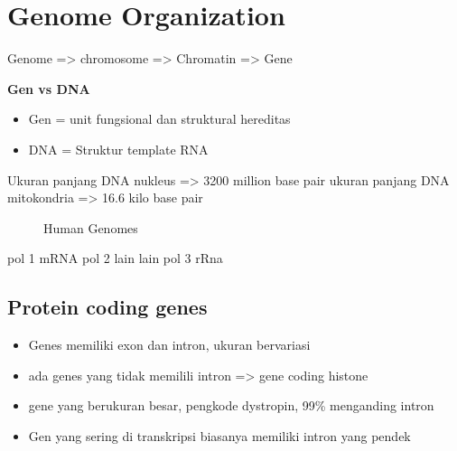 \documentclass[
  letterpaper,
  DIV=11,
  numbers=noendperiod]{scrreprt}
\providecommand{\tightlist}{%
  \setlength{\itemsep}{0pt}\setlength{\parskip}{0pt}}\usepackage{longtable,booktabs,array}
\begin{document}
\section{Genome Organization}\label{genome-organization}

Genome =\textgreater{} chromosome =\textgreater{} Chromatin
=\textgreater{} Gene

\textbf{Gen vs DNA}

\begin{itemize}
\tightlist
\item
  Gen = unit fungsional dan struktural hereditas
\item
  DNA = Struktur template RNA
\end{itemize}

Ukuran panjang DNA nukleus =\textgreater{} 3200 million base pair ukuran
panjang DNA mitokondria =\textgreater{} 16.6 kilo base pair

\begin{figure}


\caption{\label{fig-genomes}Human Genomes}

\end{figure}%

pol 1 mRNA pol 2 lain lain pol 3 rRna

\subsection{Protein coding genes}\label{protein-coding-genes}

\begin{itemize}
\tightlist
\item
  Genes memiliki exon dan intron, ukuran bervariasi
\item
  ada genes yang tidak memilili intron =\textgreater{} gene coding
  histone
\item
  gene yang berukuran besar, pengkode dystropin, 99\% menganding intron
\item
  Gen yang sering di transkripsi biasanya memiliki intron yang pendek
\end{itemize}
\end{document}
